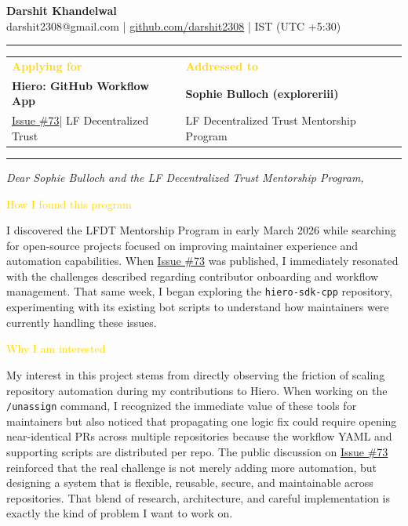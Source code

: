 \documentclass[11pt]{article}
\newcommand{\sectionlabel}[1]{\textcolor{gold}{\textbf{\fontsize{11pt}{13pt}\selectfont #1}}}
\newcommand{\issueseventythree}{\href{https://github.com/LF-Decentralized-Trust-Mentorships/mentorship-program/issues/73}{Issue \#73}\xspace}
\begin{document}
\color{ink}
{\LARGE\textbf{Darshit Khandelwal}}\\
{\small\textcolor{muted}{darshit2308@gmail.com | \href{https://github.com/darshit2308}{github.com/darshit2308} | IST (UTC +5:30)}}\\[-6pt]
\rule{\linewidth}{0.5pt}

\begin{tabularx}{\linewidth}{@{}X X@{}}
\sectionlabel{Applying for} & \sectionlabel{Addressed to} \\
\textbf{Hiero: GitHub Workflow App} & \textbf{Sophie Bulloch (exploreriii)} \\
\issueseventythree | LF Decentralized Trust & LF Decentralized Trust Mentorship Program
\end{tabularx}

\vspace{-5pt}
\rule{\linewidth}{0.4pt}

\textit{Dear Sophie Bulloch and the LF Decentralized Trust Mentorship Program,}

\nopagebreak[4]

{\fontsize{15pt}{18pt}\selectfont\textcolor{gold}{How I found this program}}

I discovered the LFDT Mentorship Program in early March 2026 while searching for open-source projects focused on improving maintainer experience and automation capabilities. When \issueseventythree was published, I immediately resonated with the challenges described regarding contributor onboarding and workflow management. That same week, I began exploring the \texttt{hiero-sdk-cpp} repository, experimenting with its existing bot scripts to understand how maintainers were currently handling these issues.  

{\fontsize{15pt}{18pt}\selectfont\textcolor{gold}{Why I am interested}}

My interest in this project stems from directly observing the friction of scaling repository automation during my contributions to Hiero. When working on the \texttt{/unassign} command, I recognized the immediate value of these tools for maintainers but also noticed that propagating one logic fix could require opening near-identical PRs across multiple repositories because the workflow YAML and supporting scripts are distributed per repo. The public discussion on \issueseventythree reinforced that the real challenge is not merely adding more automation, but designing a system that is flexible, reusable, secure, and maintainable across repositories. That blend of research, architecture, and careful implementation is exactly the kind of problem I want to work on.
\end{document}
